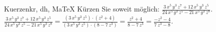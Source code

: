 \begin{MAufgabe}{Kuerzen}{kr, dh, MaTeX}
K\"urzen Sie soweit m\"oglich: $\frac{3\, x^5\, y^3\, z^7 + 12\, x^5\, y^3\, z^5}{24\, x^5\, y^3\, z^5 - 21\, x^5\, y^3\, z^8}$.\\ 
\ifLsg\MLoesung
\quad $\frac{3\, x^5\, y^3\, z^7 + 12\, x^5\, y^3\, z^5}{24\, x^5\, y^3\, z^5 - 21\, x^5\, y^3\, z^8}=\frac{(3\, x^5\, y^3\, z^5)\cdot(z^2 + 4)}{(3\, x^5\, y^3\, z^5)\cdot(8 - 7\, z^3)}=\frac{z^2 + 4}{8 - 7\, z^3}=\frac{ - z^2 - 4}{7\, z^3 - 8}$.\else\relax\fi
 \end{MAufgabe}